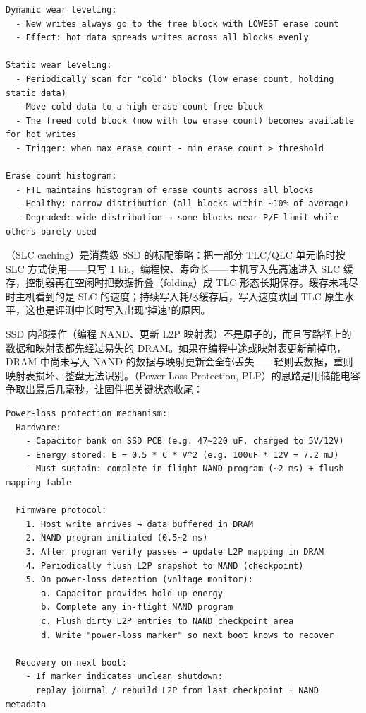 \begin{lstlisting}
Dynamic wear leveling:
  - New writes always go to the free block with LOWEST erase count
  - Effect: hot data spreads writes across all blocks evenly

Static wear leveling:
  - Periodically scan for "cold" blocks (low erase count, holding static data)
  - Move cold data to a high-erase-count free block
  - The freed cold block (now with low erase count) becomes available for hot writes
  - Trigger: when max_erase_count - min_erase_count > threshold

Erase count histogram:
  - FTL maintains histogram of erase counts across all blocks
  - Healthy: narrow distribution (all blocks within ~10% of average)
  - Degraded: wide distribution → some blocks near P/E limit while others barely used
\end{lstlisting}


（SLC caching）是消费级 SSD 的标配策略：把一部分 TLC/QLC 单元临时按 SLC 方式使用——只写 1 bit，编程快、寿命长——主机写入先高速进入 SLC 缓存，控制器再在空闲时把数据折叠（folding）成 TLC 形态长期保存。缓存未耗尽时主机看到的是 SLC 的速度；持续写入耗尽缓存后，写入速度跌回 TLC 原生水平，这也是评测中长时写入出现"掉速"的原因。


SSD 内部操作（编程 NAND、更新 L2P 映射表）不是原子的，而且写路径上的数据和映射表都先经过易失的 DRAM。如果在编程中途或映射表更新前掉电，DRAM 中尚未写入 NAND 的数据与映射更新会全部丢失——轻则丢数据，重则映射表损坏、整盘无法识别。（Power-Loss Protection, PLP）的思路是用储能电容争取出最后几毫秒，让固件把关键状态收尾：

\begin{lstlisting}
Power-loss protection mechanism:
  Hardware:
    - Capacitor bank on SSD PCB (e.g. 47~220 uF, charged to 5V/12V)
    - Energy stored: E = 0.5 * C * V^2 (e.g. 100uF * 12V = 7.2 mJ)
    - Must sustain: complete in-flight NAND program (~2 ms) + flush mapping table

  Firmware protocol:
    1. Host write arrives → data buffered in DRAM
    2. NAND program initiated (0.5~2 ms)
    3. After program verify passes → update L2P mapping in DRAM
    4. Periodically flush L2P snapshot to NAND (checkpoint)
    5. On power-loss detection (voltage monitor):
       a. Capacitor provides hold-up energy
       b. Complete any in-flight NAND program
       c. Flush dirty L2P entries to NAND checkpoint area
       d. Write "power-loss marker" so next boot knows to recover

  Recovery on next boot:
    - If marker indicates unclean shutdown:
      replay journal / rebuild L2P from last checkpoint + NAND metadata
\end{lstlisting}

